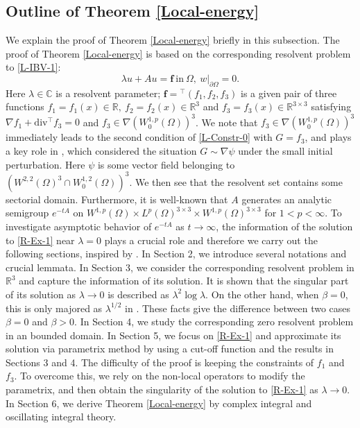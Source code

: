 \documentclass[dvipdfmx,12pt]{article}
\begin{document}
\subsection{Outline of Theorem \ref{Local-energy}}
We explain the proof of Theorem \ref{Local-energy} briefly in this subsection. The proof of Theorem \ref{Local-energy} is based on the corresponding resolvent problem to \eqref{L-IBV-1}:
\begin{equation}
\label{R-Ex-1}
\lambda u+Au=\mathbf{f}~\text{in}~\Omega, ~
w|_{\partial \Omega}=0.
\end{equation}
Here $\lambda\in\mathbb{C}$ is a resolvent parameter;  $\mathbf{f}={}^\top(f_1,f_2,f_3)$ is a given pair of three functions $f_1=f_1(x)\in\mathbb{R},~f_2=f_2(x)\in\mathbb{R}^3$ and $f_3=f_3(x)\in\mathbb{R}^{3\times3}$ satisfying $\nabla f_1+\mathrm{div} {}^\top f_3=0$ and $f_3\in \nabla(W_0^{1,p}(\Omega))^3$.
We note that $f_3\in \nabla(W_0^{1,p}(\Omega))^3$ immediately leads to the second condition of \eqref{L-Constr-0} with $G=f_3$, and plays a key role in \cite{CW18,I20, I22, Q11}, which considered the situation $G \sim \nabla \psi$ under the small initial perturbation. Here $\psi$ is some vector field belonging to $(W^{2,2}(\Omega)^{3} \cap W_0^{1,2}(\Omega))^{3}$.
We then see that the resolvent set contains some sectorial domain. Furthermore, it is well-known that $A$ generates an analytic semigroup $e^{-tA}$ on $W^{1,p}(\Omega)\times L^{p}(\Omega)^{3\times3} \times W^{1,p}(\Omega)^{3\times3}$ for $1<p<\infty$. To investigate asymptotic behavior of $e^{-tA}$ as $t\to\infty$, the information of the solution to \eqref{R-Ex-1} near $\lambda=0$ plays a crucial role and therefore we carry out the following sections, inspired by \cite{K97,SE18}. In Section 2, we introduce several notations and crucial lemmata. In Section 3, we consider the corresponding resolvent problem in $\mathbb{R}^3$ and capture the information of its solution. It is shown that the singular part of its solution as $\lambda\to0$ is described as $\lambda^2\log \lambda$. On the other hand, when $\beta=0$, this is only majored as $\lambda^{1/2}$ in \cite{K97}. These facts give the difference between two cases $\beta=0$ and $\beta>0$. In Section 4, we study the corresponding zero resolvent problem in an bounded domain.  In Section 5, we focus on \eqref{R-Ex-1} and approximate its solution via parametrix method by using a cut-off function and the results in Sections 3 and 4. The difficulty of the proof is keeping the constraints of $f_1$ and $f_3$. To overcome this, we rely on the non-local operators to modify the parametrix, and then obtain the singularity of the solution to \eqref{R-Ex-1} as $\lambda\to0$. In Section 6, we derive Theorem \ref{Local-energy} by complex integral and oscillating integral theory.
\end{document}
